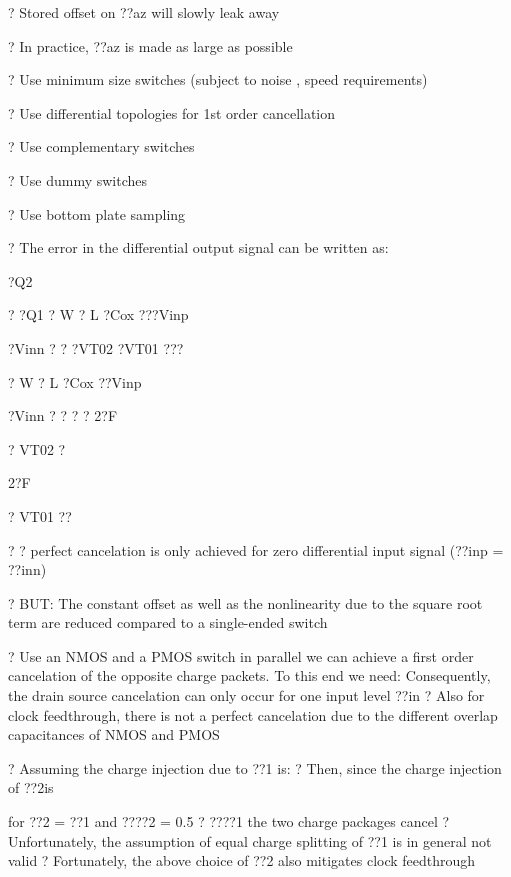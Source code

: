 \documentclass[2pt,landscape]{article}
\begin{document}
\begin{multicols*}{5}
?	Stored offset on ??az will slowly leak away

?	In practice, ??az  is made as large as possible



?	Use minimum size switches
(subject to noise , speed requirements)


?	Use differential topologies 
for 1st order cancellation


?	Use complementary switches


?	Use dummy switches


?	Use bottom plate sampling





?	The error in the differential output signal can be written as:


?Q2


?	?Q1  ? W ? L ?Cox  
???Vinp


?Vinn ? ? ?VT02  ?VT01 
???


? W ? L ?Cox  ??Vinp


?Vinn ? ? ? ? 2?F


? VT02 ?


2?F


? VT01 ??


?	?
perfect cancelation is only achieved for zero differential 
input signal (??inp = ??inn)

?	BUT: The constant offset as well as the nonlinearity due to the 
square root term are reduced compared to a single-ended 
switch




?	Use an NMOS and a PMOS switch in parallel
we can achieve a first order cancelation of the opposite 
charge packets. To this end we need:
Consequently, the drain source cancelation can only occur 
for one input level ??in
?	Also for clock feedthrough, there is not a perfect cancelation due 
to the different overlap capacitances of NMOS and PMOS





?	Assuming the charge injection due to ??1 is:
?	Then, since the charge injection of ??2is

for ??2  = ??1  and ????2  = 0.5 ? ????1  the two charge packages cancel
?	Unfortunately, the assumption of equal charge splitting of ??1 is in 
general not valid
?	Fortunately, the above choice of ??2 also mitigates clock feedthrough




















\end{multicols*}
\end{document}
